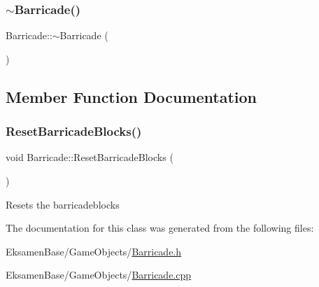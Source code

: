 \subsubsection{\texorpdfstring{$\sim$\+Barricade()}{~Barricade()}}
{\footnotesize\ttfamily Barricade\+::$\sim$\+Barricade (\begin{DoxyParamCaption}{ }\end{DoxyParamCaption})}



\subsection{Member Function Documentation}
\mbox{\label{class_barricade_afae6747d40e49e937efaa1dd063a4461}} 
\subsubsection{\texorpdfstring{Reset\+Barricade\+Blocks()}{ResetBarricadeBlocks()}}
{\footnotesize\ttfamily void Barricade\+::\+Reset\+Barricade\+Blocks (\begin{DoxyParamCaption}{ }\end{DoxyParamCaption})}



Resets the barricadeblocks 



The documentation for this class was generated from the following files\+:\begin{DoxyCompactItemize}
\item 
Eksamen\+Base/\+Game\+Objects/\mbox{\hyperlink{_barricade_8h}{Barricade.\+h}}\item 
Eksamen\+Base/\+Game\+Objects/\mbox{\hyperlink{_barricade_8cpp}{Barricade.\+cpp}}\end{DoxyCompactItemize}
